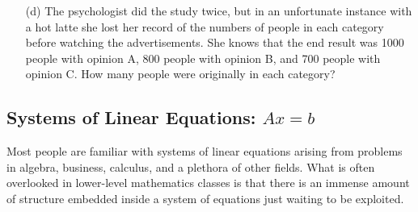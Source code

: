 \begin{problem}
\begin{enumerate}
        \item[(d)] The psychologist did the study twice, but in an unfortunate instance with a
            hot latte she lost her record of the numbers of people in each category before
            watching the advertisements.  She knows that the end result was 1000 people
            with opinion A, 800 people with opinion B, and 700 people with opinion C.  How
            many people were originally in each category?
    \end{enumerate}
\end{problem}




\subsection*{Systems of Linear Equations: $Ax = b$}
Most people are familiar with systems of linear equations arising from problems in
algebra, business, calculus, and a plethora of other fields.  What is often overlooked in
lower-level mathematics classes is that there is an immense amount of structure embedded
inside a system of equations just waiting to be exploited.  

